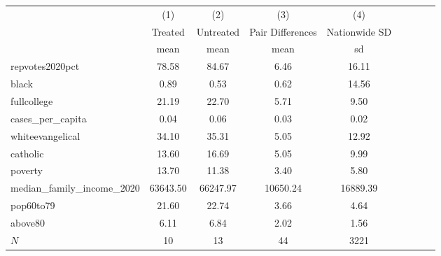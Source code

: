 {
\def\sym#1{\ifmmode^{#1}\else\(^{#1}\)\fi}
\begin{tabular}{l*{4}{cc}}
\hline\hline
            &\multicolumn{1}{c}{(1)}&\multicolumn{1}{c}{(2)}&\multicolumn{1}{c}{(3)}&\multicolumn{1}{c}{(4)}\\
            &     Treated&   Untreated&Pair Differences&Nationwide SD\\
            &        mean&        mean&        mean&          sd\\
\hline
repvotes2020pct&       78.58&       84.67&        6.46&       16.11\\
black       &        0.89&        0.53&        0.62&       14.56\\
fullcollege &       21.19&       22.70&        5.71&        9.50\\
cases\_per\_capita&        0.04&        0.06&        0.03&        0.02\\
whiteevangelical&       34.10&       35.31&        5.05&       12.92\\
catholic    &       13.60&       16.69&        5.05&        9.99\\
poverty     &       13.70&       11.38&        3.40&        5.80\\
median\_family\_income\_2020&    63643.50&    66247.97&    10650.24&    16889.39\\
pop60to79   &       21.60&       22.74&        3.66&        4.64\\
above80     &        6.11&        6.84&        2.02&        1.56\\
\hline
\(N\)       &          10&          13&          44&        3221\\
\hline\hline
\end{tabular}
}
